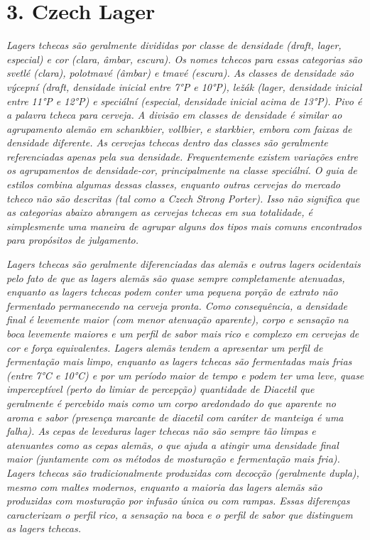 \section*{3. Czech Lager}
\textit{Lagers tchecas são geralmente divididas por classe de densidade (draft, lager, especial) e cor (clara, âmbar, escura). Os nomes tchecos para essas categorias são svetlé (clara), polotmavé (âmbar) e tmavé (escura). As classes de densidade são výcepní (draft, densidade inicial entre 7°P e 10°P), ležák (lager, densidade inicial entre 11°P e 12°P) e speciální (especial, densidade inicial acima de 13°P). Pivo é a palavra tcheca para cerveja. A divisão em classes de densidade é similar ao agrupamento alemão em schankbier, vollbier, e starkbier, embora com faixas de densidade diferente. As cervejas tchecas dentro das classes são geralmente referenciadas apenas pela sua densidade. Frequentemente existem variações entre os agrupamentos de densidade-cor, principalmente na classe speciální. O guia de estilos combina algumas dessas classes, enquanto outras cervejas do mercado tcheco não são descritas (tal como a Czech Strong Porter). Isso não significa que as categorias abaixo abrangem as cervejas tchecas em sua totalidade, é simplesmente uma maneira de agrupar alguns dos tipos mais comuns encontrados para propósitos de julgamento.}

\textit{Lagers tchecas são geralmente diferenciadas das alemãs e outras lagers ocidentais pelo fato de que as lagers alemãs são quase sempre completamente atenuadas, enquanto as lagers tchecas podem conter uma pequena porção de extrato não fermentado permanecendo na cerveja pronta. Como consequência, a densidade final é levemente maior (com menor atenuação aparente), corpo e sensação na boca levemente maiores e um perfil de sabor mais rico e complexo em cervejas de cor e força equivalentes. Lagers alemãs tendem a apresentar um perfil de fermentação mais limpo, enquanto as lagers tchecas são fermentadas mais frias (entre 7°C e 10°C) e por um período maior de tempo e podem ter uma leve, quase imperceptível (perto do limiar de percepção) quantidade de Diacetil que geralmente é percebido mais como um corpo aredondado do que aparente no aroma e sabor (presença marcante de diacetil com caráter de manteiga é uma falha). As cepas de leveduras lager tchecas não são sempre tão limpas e atenuantes como as cepas alemãs, o que ajuda a atingir uma densidade final maior (juntamente com os métodos de mosturação e fermentação mais fria). Lagers tchecas são tradicionalmente produzidas com decocção (geralmente dupla), mesmo com maltes modernos, enquanto a maioria das lagers alemãs são produzidas com mosturação por infusão única ou com rampas. Essas diferenças caracterizam o perfil rico, a sensação na boca e o perfil de sabor que distinguem as lagers tchecas.}